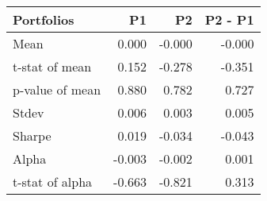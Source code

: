 \begin{tabular}{lrrr}
\toprule
Portfolios & P1 & P2 & P2 - P1 \\
\midrule
Mean & 0.000 & -0.000 & -0.000 \\
t-stat of mean & 0.152 & -0.278 & -0.351 \\
p-value of mean & 0.880 & 0.782 & 0.727 \\
Stdev & 0.006 & 0.003 & 0.005 \\
Sharpe & 0.019 & -0.034 & -0.043 \\
Alpha & -0.003 & -0.002 & 0.001 \\
t-stat of alpha & -0.663 & -0.821 & 0.313 \\
\bottomrule
\end{tabular}
